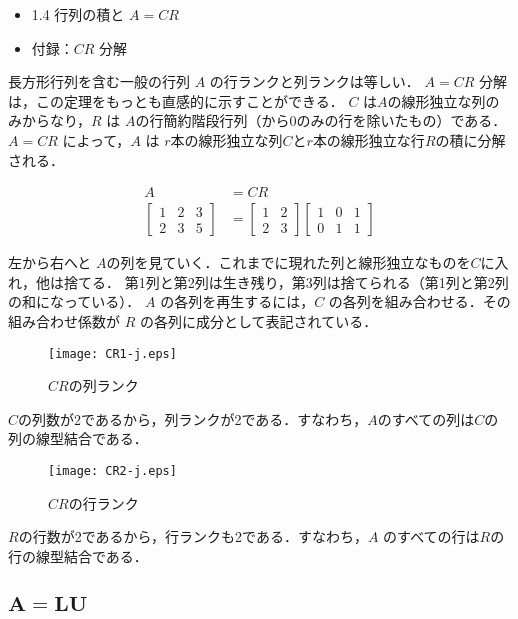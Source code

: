 \documentclass[letterpaper]{article}
\begin{document}
\begin{itemize}
  \item 1.4 行列の積と $A=CR$
  \item 付録：$CR$ 分解
\end{itemize}

長方形行列を含む一般の行列 $A$ の行ランクと列ランクは等しい．
$A=CR$ 分解は，この定理をもっとも直感的に示すことができる．
$C$ は$A$の線形独立な列のみからなり，$R$ は $A$の行簡約階段行列（から0のみの行を除いたもの）である．
$A=CR$ によって，$A$ は $r$本の線形独立な列$C$と$r$本の線形独立な行$R$の積に分解される．

\begin{equation*}
  \begin{split}
    A &= CR\\
  \begin{bmatrix}
    1 & 2 & 3 \\
    2 & 3 & 5
  \end{bmatrix}
  & =
  \begin{bmatrix}
    1 & 2 \\
    2 & 3
  \end{bmatrix}
  \begin{bmatrix}
    1 & 0 & 1 \\
    0 & 1 & 1
  \end{bmatrix}
\end{split}
\end{equation*}

左から右へと $A$の列を見ていく．これまでに現れた列と線形独立なものを$C$に入れ，他は捨てる．
第1列と第2列は生き残り，第3列は捨てられる（第1列と第2列の和になっている）．
$A$ の各列を再生するには，$C$ の各列を組み合わせる．その組み合わせ係数が $R$ の各列に成分として表記されている．

\begin{figure}[H]
  \centering
  \texttt{[image: CR1-j.eps]}
  \caption{$CR$の列ランク}
\end{figure}

$C$の列数が2であるから，列ランクが2である．すなわち，$A$のすべての列は$C$の列の線型結合である．

\begin{figure}[H]
  \centering
  \texttt{[image: CR2-j.eps]}
  \caption{$CR$の行ランク}
\end{figure}

$R$の行数が2であるから，行ランクも2である．すなわち，$A$ のすべての行は$R$の行の線型結合である．

\subsection{$\boldsymbol{A=LU}$}
\end{document}
